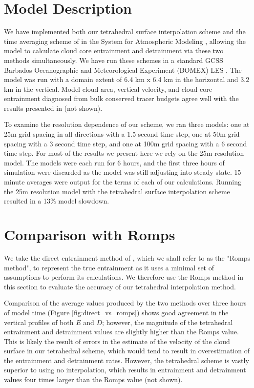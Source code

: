\documentclass[12pt]{article}
\begin{document}

\section{Model Description}

We have implemented both our tetrahedral surface interpolation scheme and the 
time averaging scheme of \cite{Romps2010} in the System for Atmospheric 
Modeling \citep[SAM;][]{Khairoutdinov2003}, allowing the model to calculate 
cloud core entrainment and detrainment via these two methods simultaneously.
We have run these schemes in a standard GCSS Barbados Oceanographic and 
Meteorological Experiment (BOMEX) LES \citep{Holland1973, Siebesma2003}.  
The model was run with a domain extent of 6.4 km x 6.4 km in 
the horizontal and 3.2 km in the vertical.  Model cloud area, vertical 
velocity, and cloud core entrainment diagnosed from bulk conserved tracer 
budgets agree well with the results presented in \cite{Siebesma2003} (not 
shown).

To examine the resolution dependence of our scheme, we ran three models: one at 
25m grid spacing in all directions with a 1.5 second time step, one at 50m grid 
spacing with a 3 second time step, and one at 100m grid spacing with a 6 second 
time step.  For most of the results we present here we rely on the 25m 
resolution model.  The models were each run for 6 hours, and the first 
three hours of simulation were discarded as the model was still adjusting into 
steady-state.  15 minute averages were output for the terms of each of our 
calculations.  Running the 25m resolution model with the tetrahedral surface 
interpolation scheme resulted in a 13\% model slowdown.  


\section{Comparison with Romps}

We take the direct entrainment method of \cite{Romps2010}, which we shall 
refer to as the "Romps method", to represent the true entrainment as it uses 
a minimal set of assumptions to perform its calculations.  We therefore use 
the Romps method in this section to evaluate the accuracy of our tetrahedral 
interpolation method.

Comparison of the average values produced by the two methods over three hours 
of model time (Figure \ref{fig:direct_vs_romps}) shows good agreement in the 
vertical profiles of both $E$ and $D$; however, the magnitude of the 
tetrahedral entrainment and detrainment values are slightly higher than the 
Romps value.  This is likely the result of errors in the estimate of the 
velocity of the cloud surface in our tetrahedral scheme, which would tend to 
result in overestimation of the entrainment and detrainment rates.  
However, the tetrahedral scheme is vastly superior to using no interpolation, 
which results in entrainment and detrainment values four times larger than 
the Romps value (not shown).  
\end{document}
